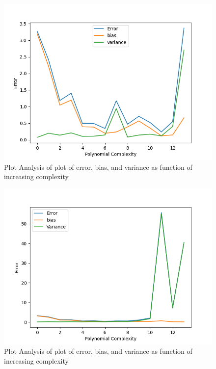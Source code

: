 \begin{figure}
    \centering
\includegraphics[width=1.0\linewidth]{figures/bootstrap 1.png}
    \caption{Plot Analysis of  plot of error, bias, and variance as function of increasing complexity}
    \label{fig:2}
\end{figure}

\begin{figure}
    \centering
\includegraphics[width=1.0\linewidth]{figures/bootrstrap2.png}
    \caption{Plot Analysis of  plot of error, bias, and variance as function of increasing complexity}
    \label{fig:3}
\end{figure}

